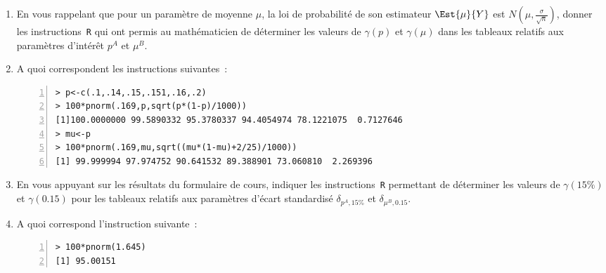 \documentclass[10pt]{report}
\begin{document}
\begin{exercice}
\begin{enumerate}
\item En vous rappelant que pour un paramètre de moyenne $\mu$, la loi de probabilité de son estimateur $\Est{\mu}{Y}$ est $N(\mu,\frac{\sigma}{\sqrt{n}})$, donner les instructions~\texttt{R} qui ont permis au mathématicien de déterminer les valeurs de $\gamma(p)$ et $\gamma(\mu)$ dans les tableaux relatifs aux paramètres d'intérêt $p^A$ et $\mu^B$.
\item A quoi correspondent les instructions suivantes~:
\begin{Verbatim}[frame=leftline,fontfamily=tt,fontshape=n,numbers=left]
> p<-c(.1,.14,.15,.151,.16,.2)
> 100*pnorm(.169,p,sqrt(p*(1-p)/1000))
[1]100.0000000 99.5890332 95.3780337 94.4054974 78.1221075  0.7127646
> mu<-p
> 100*pnorm(.169,mu,sqrt((mu*(1-mu)+2/25)/1000))
[1] 99.999994 97.974752 90.641532 89.388901 73.060810  2.269396
\end{Verbatim}

\item En vous appuyant sur les résultats du formulaire de cours, indiquer les instructions~\texttt{R} permettant de déterminer les valeurs de $\gamma(15\%)$ et $\gamma(0.15)$ pour les tableaux relatifs aux paramètres d'écart standardisé $\delta_{p^A,15\%}$ et $\delta_{\mu^B,0.15}$.
\item A quoi correspond l'instruction suivante~:
\begin{Verbatim}[frame=leftline,fontfamily=tt,fontshape=n,numbers=left]
> 100*pnorm(1.645)
[1] 95.00151
\end{Verbatim}

\end{enumerate}
\end{exercice}
\end{document}
